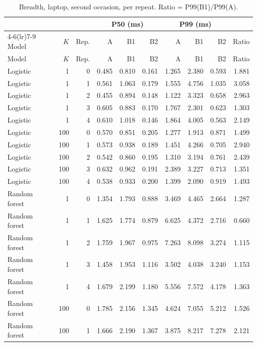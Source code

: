 \documentclass[10pt,a4paper]{article}
\begin{document}
\begin{longtable}{lrrrrrrrrr}
\caption{Breadth, laptop, second occasion, per repeat. Ratio = P99(B1)/P99(A).}\label{tab:lap2_rep}\\
\toprule
 & & & \multicolumn{3}{c}{P50 (ms)} & \multicolumn{3}{c}{P99 (ms)} & \\
\cmidrule(lr){4-6}\cmidrule(lr){7-9}
Model & $K$ & Rep. & A & B1 & B2 & A & B1 & B2 & Ratio \\
\midrule
\endfirsthead
\toprule
Model & $K$ & Rep. & A & B1 & B2 & A & B1 & B2 & Ratio \\
\midrule
\endhead
Logistic & 1 & 0 & 0.485 & 0.810 & 0.161 & 1.265 & 2.380 & 0.593 & 1.881 \\
Logistic & 1 & 1 & 0.561 & 1.063 & 0.179 & 1.555 & 4.756 & 1.035 & 3.058 \\
Logistic & 1 & 2 & 0.455 & 0.894 & 0.148 & 1.122 & 3.323 & 0.658 & 2.963 \\
Logistic & 1 & 3 & 0.605 & 0.883 & 0.170 & 1.767 & 2.301 & 0.623 & 1.303 \\
Logistic & 1 & 4 & 0.610 & 1.018 & 0.146 & 1.864 & 4.005 & 0.563 & 2.149 \\
Logistic & 100 & 0 & 0.570 & 0.851 & 0.205 & 1.277 & 1.913 & 0.871 & 1.499 \\
Logistic & 100 & 1 & 0.573 & 0.938 & 0.189 & 1.451 & 4.266 & 0.705 & 2.940 \\
Logistic & 100 & 2 & 0.542 & 0.860 & 0.195 & 1.310 & 3.194 & 0.761 & 2.439 \\
Logistic & 100 & 3 & 0.632 & 0.962 & 0.191 & 2.389 & 3.227 & 0.713 & 1.351 \\
Logistic & 100 & 4 & 0.538 & 0.933 & 0.200 & 1.399 & 2.090 & 0.919 & 1.493 \\
Random forest & 1 & 0 & 1.354 & 1.793 & 0.888 & 3.469 & 4.465 & 2.664 & 1.287 \\
Random forest & 1 & 1 & 1.625 & 1.774 & 0.879 & 6.625 & 4.372 & 2.716 & 0.660 \\
Random forest & 1 & 2 & 1.759 & 1.967 & 0.975 & 7.263 & 8.098 & 3.274 & 1.115 \\
Random forest & 1 & 3 & 1.458 & 1.953 & 1.116 & 3.502 & 4.038 & 3.240 & 1.153 \\
Random forest & 1 & 4 & 1.679 & 2.199 & 1.180 & 5.556 & 7.572 & 4.178 & 1.363 \\
Random forest & 100 & 0 & 1.785 & 2.156 & 1.345 & 4.624 & 7.055 & 5.212 & 1.526 \\
Random forest & 100 & 1 & 1.666 & 2.190 & 1.367 & 3.875 & 8.217 & 7.278 & 2.121 \\

\end{longtable}
\end{document}
